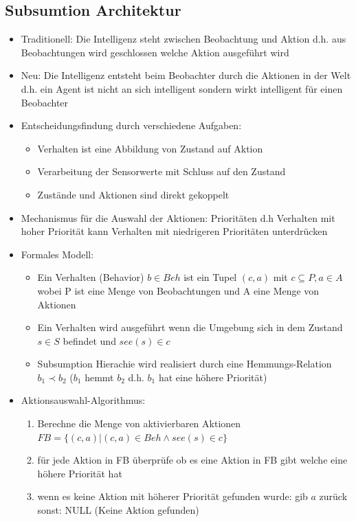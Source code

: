 \documentclass{article} %
\begin{document}
	\subsection{Subsumtion Architektur}
	\begin{itemize}
		\item Traditionell: Die Intelligenz steht zwischen Beobachtung und Aktion d.h. aus Beobachtungen wird geschlossen welche Aktion ausgeführt wird
		\item Neu: Die Intelligenz entsteht beim Beobachter durch die Aktionen in der Welt d.h. ein Agent ist nicht an sich intelligent sondern wirkt intelligent für einen Beobachter
		\item Entscheidungsfindung durch verschiedene Aufgaben:
		\begin{itemize}
			\item Verhalten ist eine Abbildung von Zustand auf Aktion
			\item Verarbeitung der Sensorwerte mit Schluss auf den Zustand
			\item Zustände und Aktionen sind direkt gekoppelt
		\end{itemize}
		\item Mechanismus für die Auswahl der Aktionen: Prioritäten d.h Verhalten mit hoher Priorität kann Verhalten mit niedrigeren Prioritäten unterdrücken
		\item Formales Modell:
		\begin{itemize}
			\item Ein Verhalten (Behavior) $b \in Beh$ ist ein Tupel $(c,a)$ mit $c \subseteq P, a \in A$ wobei P ist eine Menge von Beobachtungen und A eine Menge von Aktionen
			\item Ein Verhalten wird ausgeführt wenn die Umgebung sich in dem Zustand $s\in S$ befindet und $see(s) \in c$
			\item Subsumption Hierachie wird realisiert durch eine Hemmungs-Relation $b_{1} \prec b_{2}$ ($b_{1}$ hemmt $b_{2}$ d.h. $b_{1}$ hat eine höhere Priorität)
		\end{itemize}
		\item Aktionsauswahl-Algorithmus:
		\begin{enumerate}
			\item Berechne die Menge von aktivierbaren Aktionen $FB = \{(c,a)|(c,a)\in Beh \wedge see(s)\in c\}$
			\item für jede Aktion in FB überprüfe ob es eine Aktion in FB gibt welche eine höhere Priorität hat
			\item wenn es keine Aktion mit höherer Priorität gefunden wurde: gib $a$ zurück sonst: NULL (Keine Aktion gefunden)

\end{enumerate}
\end{itemize}
\end{document}
